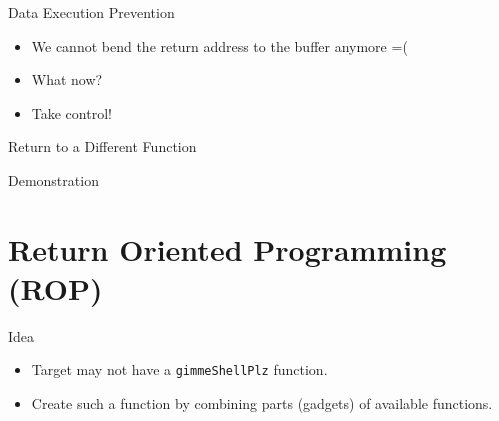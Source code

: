 \documentclass[beamer]{uibk}
\begin{document}
\begin{frame}{Data Execution Prevention}
    \begin{itemize}
        \item We cannot bend the return address to the buffer anymore =(
        \item What now?
        \bigskip
        \pause
        \item Take control!
    \end{itemize}
\end{frame}

\begin{frame}{Return to a Different Function}
    \begin{center}
        \huge Demonstration
    \end{center}
\end{frame}

\section{Return Oriented Programming (ROP)}

\begin{frame}{Idea}
    \begin{itemize}
        \item Target may not have a \texttt{gimmeShellPlz} function.
        \bigskip
        \pause
        \item Create such a function by combining parts (gadgets) of available
            functions.
    \end{itemize}
\end{frame}
\end{document}
